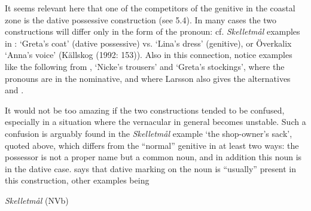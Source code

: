 
It seems relevant here that one of the competitors of the genitive in the coastal zone is the dative possessive construction (see 5.4). In many cases the two constructions will differ only in the form of the pronoun: cf. \textit{Skelletmål} examples in \citet{Marklund1976}:  ‘Greta’s coat’ (dative possessive) vs.   ‘Lina’s dress’ (genitive), or Överkalix  ‘Anna’s voice’ (Källskog (1992: 153)). Also in this connection, notice examples like the following from \citet[125]{Larsson1929}, ‘Nicke’s trousers’ and  ‘Greta’s stockings’, where the pronouns are in the nominative, and where Larsson also gives the alternatives  and .


It would not be too amazing if the two constructions tended to be confused, especially in a situation where the vernacular in general becomes unstable. Such a confusion is arguably found in the \textit{Skelletmål} example ‘the shop-owner’s sack’, quoted above, which differs from the “normal” genitive in at least two ways: the possessor is not a proper name but a common noun, and in addition this noun is in the dative case. \citet[23]{Marklund1976} says that dative marking on the noun is “usually” present in this construction, other examples being 


\item 

\label{bkm:Ref136428236}\textit{Skelletmål} (NVb)


